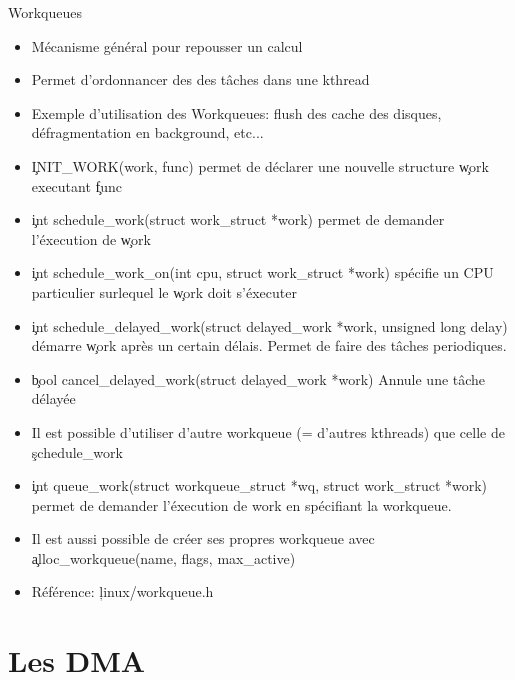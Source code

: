 \begin{frame}[fragile=singleslide]{Workqueues}
  \begin{itemize} 
  \item Mécanisme général pour repousser un calcul
  \item Permet d'ordonnancer des des tâches dans une kthread
  \item  Exemple d'utilisation  des  Workqueues: flush  des cache  des
    disques, défragmentation en background, etc...
  \item  \c{INIT_WORK(work,  func)} permet  de  déclarer une  nouvelle
    structure \c{work} executant \c{func}
  \item \c{int schedule_work(struct work_struct *work)} permet de
    demander l'éxecution de \c{work}
  \item  \c{int schedule_work_on(int  cpu, struct  work_struct *work)}
    spécifie un CPU particulier surlequel le \c{work} doit s'éxecuter
  \item
    \c{int schedule_delayed_work(struct delayed_work *work, unsigned long delay)}
    démarre \c{work} après un certain délais. Permet de faire des
    tâches periodiques.
  \item \c{bool cancel_delayed_work(struct delayed_work *work)} Annule
    une tâche délayée
  \item  Il  est possible  d'utiliser  d'autre  workqueue (=  d'autres
    kthreads) que celle de \c{schedule_work}
  \item
    \c{int queue_work(struct workqueue_struct *wq, struct work_struct *work)}
    permet de demander l'éxecution de work en spécifiant la workqueue.
  \item  Il est  aussi possible  de créer  ses propres  workqueue avec
    \c{alloc_workqueue(name, flags, max_active)}
  \item Référence: \c{linux/workqueue.h}
  \end{itemize}
\end{frame}

\section{Les DMA}
 
